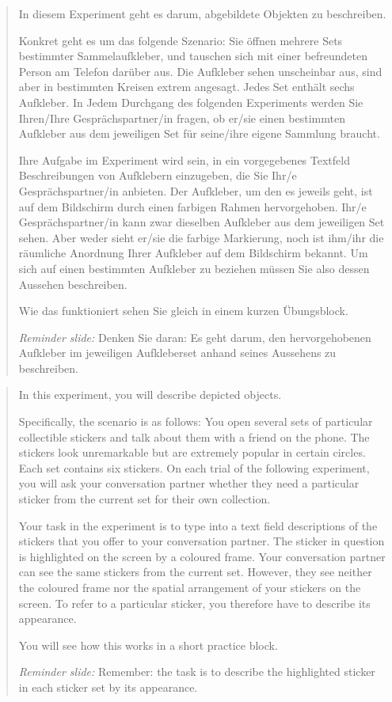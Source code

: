 \documentclass[10pt,a4paper,fleqn]{article}
\begin{document}
\begin{quote}\small
In diesem Experiment geht es darum, abgebildete Objekten zu beschreiben.

Konkret geht es um das folgende Szenario: Sie \"offnen mehrere Sets bestimmter Sammelaufkleber, und tauschen sich mit einer befreundeten Person am Telefon dar\"uber aus. Die Aufkleber sehen unscheinbar aus, sind aber in bestimmten Kreisen extrem angesagt. Jedes Set enth\"alt sechs Aufkleber. In Jedem Durchgang des folgenden Experiments werden Sie Ihren/Ihre Gespr\"achspartner/in fragen, ob er/sie einen bestimmten Aufkleber aus dem jeweiligen Set f\"ur seine/ihre eigene Sammlung braucht.

Ihre Aufgabe im Experiment wird sein, in ein vorgegebenes Textfeld Beschreibungen von Aufklebern einzugeben, die Sie Ihr/e Gespr\"achspartner/in anbieten. Der Aufkleber, um den es jeweils geht, ist auf dem Bildschirm durch einen farbigen Rahmen hervorgehoben. Ihr/e Gespr\"achspartner/in kann zwar dieselben Aufkleber aus dem jeweiligen Set sehen. Aber weder sieht er/sie die farbige Markierung, noch ist ihm/ihr die r\"aumliche Anordnung Ihrer Aufkleber auf dem Bildschirm bekannt. Um sich auf einen bestimmten Aufkleber zu beziehen m\"ussen Sie also dessen Aussehen beschreiben.

Wie das funktioniert sehen Sie gleich in einem kurzen \"Ubungsblock.

\textit{Reminder slide:} Denken Sie daran: Es geht darum, den hervorgehobenen Aufkleber im jeweiligen Aufkleberset anhand seines Aussehens zu beschreiben.
\end{quote}

\begin{quote}\small
In this experiment, you will describe depicted objects.

Specifically, the scenario is as follows: You open several sets of particular collectible stickers and talk about them with a friend on the phone. The stickers look unremarkable but are extremely popular in certain circles. Each set contains six stickers. On each trial of the following experiment, you will ask your conversation partner whether they need a particular sticker from the current set for their own collection.

Your task in the experiment is to type into a text field descriptions of the stickers that you offer to your conversation partner. The sticker in question is highlighted on the screen by a coloured frame. Your conversation partner can see the same stickers from the current set. However, they see neither the coloured frame nor the spatial arrangement of your stickers on the screen. To refer to a particular sticker, you therefore have to describe its appearance.

You will see how this works in a short practice block.

\textit{Reminder slide:} Remember: the task is to describe the highlighted sticker in each sticker set by its appearance.
\end{quote}
\end{document}
